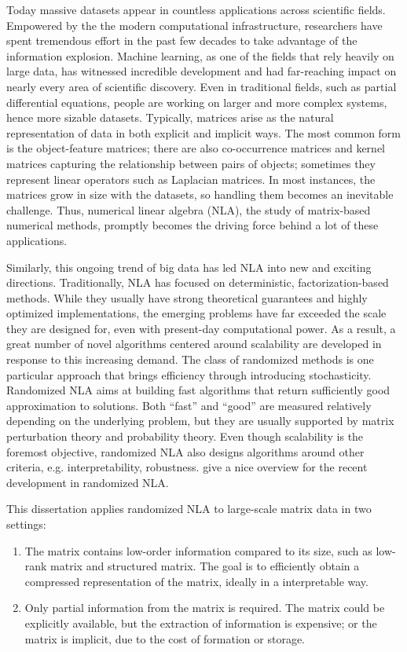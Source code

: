 Today massive datasets appear in countless applications across scientific
fields. Empowered by the the modern computational infrastructure, researchers
have spent tremendous effort in the past few decades to take advantage of the
information explosion. Machine learning, as one of the fields that rely heavily
on large data, has witnessed incredible development and had far-reaching impact
on nearly every area of scientific discovery. Even in traditional fields, such
as partial differential equations, people are working on larger and more complex
systems, hence more sizable datasets. Typically, matrices arise as the natural
representation of data in both explicit and implicit ways. The most common form
is the object\hyp{}feature matrices; there are also co-occurrence matrices and
kernel matrices capturing the relationship between pairs of objects; sometimes
they represent linear operators such as Laplacian matrices. In most instances,
the matrices grow in size with the datasets, so handling them becomes an
inevitable challenge. Thus, numerical linear algebra (NLA), the study of 
matrix\hyp{}based numerical methods, promptly becomes the driving force behind
a lot of these applications.

Similarly, this ongoing trend of big data has led NLA into new and exciting
directions. Traditionally, NLA has focused on deterministic, 
factorization\hyp{}based methods. While they usually have strong theoretical
guarantees and highly optimized implementations, the emerging problems have far
exceeded the scale they are designed for, even with present\hyp{}day
computational power. As a result, a great number of novel algorithms
centered around scalability are developed in response to this increasing demand.
The class of randomized methods is one particular approach that brings
efficiency through introducing stochasticity. Randomized NLA aims at building
fast algorithms that return sufficiently good approximation to solutions. Both
``fast'' and ``good'' are measured relatively depending on the underlying
problem, but they are usually supported by matrix perturbation theory and
probability theory. Even though scalability is the foremost objective,
randomized NLA also designs algorithms around other criteria, e.g.
interpretability, robustness. \citet{drineas2016randnla} give a nice overview
for the recent development in randomized NLA.

This dissertation applies randomized NLA to large-scale matrix data in two
settings:
\begin{enumerate}
	\item The matrix contains low\hyp{}order information compared to its size,
	such as low\hyp{}rank matrix and structured matrix. The goal is to efficiently
	obtain a compressed representation of the matrix, ideally in a interpretable
	way.
	\item Only partial information from the matrix is required. The matrix
	could be explicitly available, but the extraction of information is
	expensive; or the matrix is implicit, due to the cost of formation or
	storage.
\end{enumerate}

